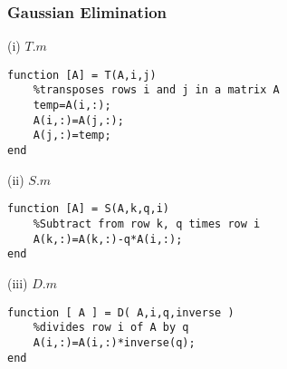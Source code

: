 \documentclass[10pt,a4paper]{report}
\begin{document}
\subsubsection{Gaussian Elimination}
\vspace{0.5cm}

(i) $T.m$
\begin{verbatim}
function [A] = T(A,i,j)
    %transposes rows i and j in a matrix A
    temp=A(i,:);
    A(i,:)=A(j,:);
    A(j,:)=temp;
end
\end{verbatim}
\vspace{0.5cm}

(ii) $S.m$
\begin{verbatim}
function [A] = S(A,k,q,i)  
    %Subtract from row k, q times row i
    A(k,:)=A(k,:)-q*A(i,:);
end
\end{verbatim}
\vspace{0.5cm}

(iii) $D.m$
\begin{verbatim}
function [ A ] = D( A,i,q,inverse )
    %divides row i of A by q
    A(i,:)=A(i,:)*inverse(q);
end
\end{verbatim}
\vspace{0.5cm}


\newpage
\end{document}
